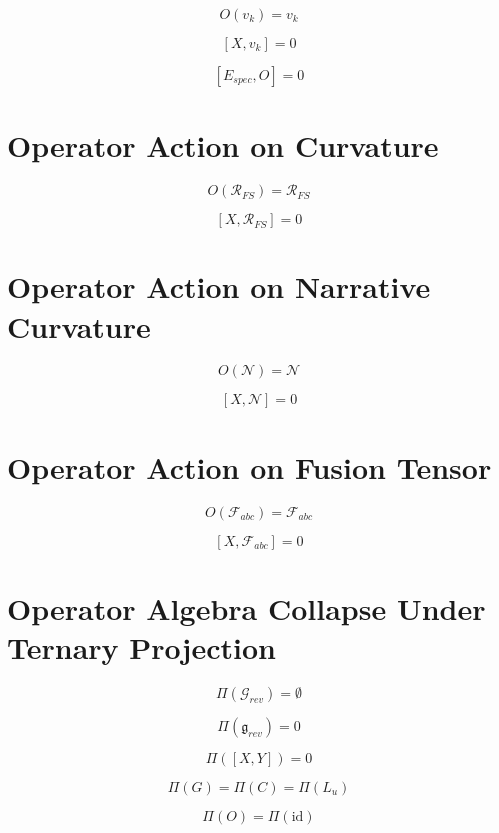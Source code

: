 \[
O(v_k) = v_k
\]

\[
[X, v_k] = 0
\]

\[
[E_{spec}, O] = 0
\]


\section*{Operator Action on Curvature}

\[
O(\mathcal{R}_{FS}) = \mathcal{R}_{FS}
\]

\[
[X, \mathcal{R}_{FS}] = 0
\]


\section*{Operator Action on Narrative Curvature}

\[
O(\mathcal{N}) = \mathcal{N}
\]

\[
[X, \mathcal{N}] = 0
\]


\section*{Operator Action on Fusion Tensor}

\[
O(\mathcal{F}_{abc}) = \mathcal{F}_{abc}
\]

\[
[X, \mathcal{F}_{abc}] = 0
\]


\section*{Operator Algebra Collapse Under Ternary Projection}

\[
\Pi(\mathcal{G}_{rev}) = \emptyset
\]

\[
\Pi(\mathfrak{g}_{rev}) = 0
\]

\[
\Pi([X,Y]) = 0
\]

\[
\Pi(G) = \Pi(C) = \Pi(L_u)
\]

\[
\Pi(O) = \Pi(\mathrm{id})
\]

